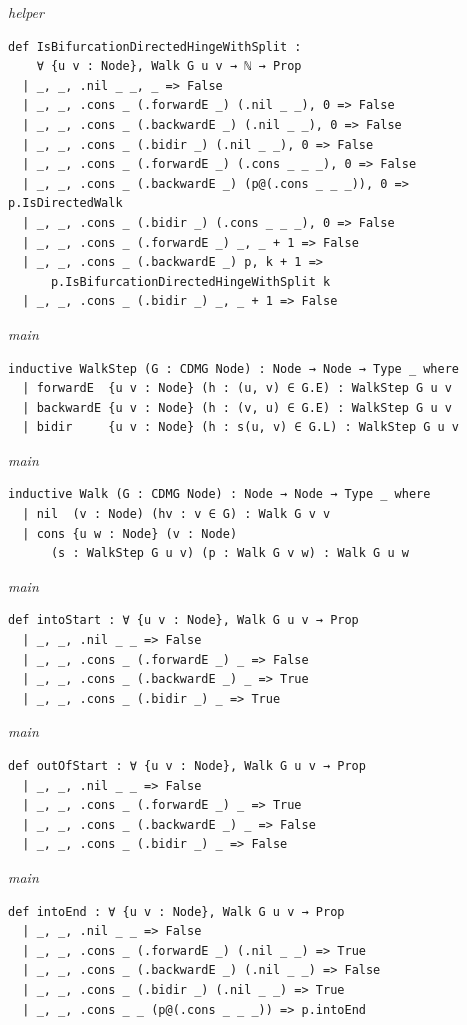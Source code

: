 {\small\textit{helper}}
\begin{verbatim}
def IsBifurcationDirectedHingeWithSplit :
    ∀ {u v : Node}, Walk G u v → ℕ → Prop
  | _, _, .nil _ _, _ => False
  | _, _, .cons _ (.forwardE _) (.nil _ _), 0 => False
  | _, _, .cons _ (.backwardE _) (.nil _ _), 0 => False
  | _, _, .cons _ (.bidir _) (.nil _ _), 0 => False
  | _, _, .cons _ (.forwardE _) (.cons _ _ _), 0 => False
  | _, _, .cons _ (.backwardE _) (p@(.cons _ _ _)), 0 => p.IsDirectedWalk
  | _, _, .cons _ (.bidir _) (.cons _ _ _), 0 => False
  | _, _, .cons _ (.forwardE _) _, _ + 1 => False
  | _, _, .cons _ (.backwardE _) p, k + 1 =>
      p.IsBifurcationDirectedHingeWithSplit k
  | _, _, .cons _ (.bidir _) _, _ + 1 => False
\end{verbatim}
{\small\textit{main}}
\begin{verbatim}
inductive WalkStep (G : CDMG Node) : Node → Node → Type _ where
  | forwardE  {u v : Node} (h : (u, v) ∈ G.E) : WalkStep G u v
  | backwardE {u v : Node} (h : (v, u) ∈ G.E) : WalkStep G u v
  | bidir     {u v : Node} (h : s(u, v) ∈ G.L) : WalkStep G u v
\end{verbatim}
{\small\textit{main}}
\begin{verbatim}
inductive Walk (G : CDMG Node) : Node → Node → Type _ where
  | nil  (v : Node) (hv : v ∈ G) : Walk G v v
  | cons {u w : Node} (v : Node)
      (s : WalkStep G u v) (p : Walk G v w) : Walk G u w
\end{verbatim}
{\small\textit{main}}
\begin{verbatim}
def intoStart : ∀ {u v : Node}, Walk G u v → Prop
  | _, _, .nil _ _ => False
  | _, _, .cons _ (.forwardE _) _ => False
  | _, _, .cons _ (.backwardE _) _ => True
  | _, _, .cons _ (.bidir _) _ => True
\end{verbatim}
{\small\textit{main}}
\begin{verbatim}
def outOfStart : ∀ {u v : Node}, Walk G u v → Prop
  | _, _, .nil _ _ => False
  | _, _, .cons _ (.forwardE _) _ => True
  | _, _, .cons _ (.backwardE _) _ => False
  | _, _, .cons _ (.bidir _) _ => False
\end{verbatim}
{\small\textit{main}}
\begin{verbatim}
def intoEnd : ∀ {u v : Node}, Walk G u v → Prop
  | _, _, .nil _ _ => False
  | _, _, .cons _ (.forwardE _) (.nil _ _) => True
  | _, _, .cons _ (.backwardE _) (.nil _ _) => False
  | _, _, .cons _ (.bidir _) (.nil _ _) => True
  | _, _, .cons _ _ (p@(.cons _ _ _)) => p.intoEnd
\end{verbatim}
